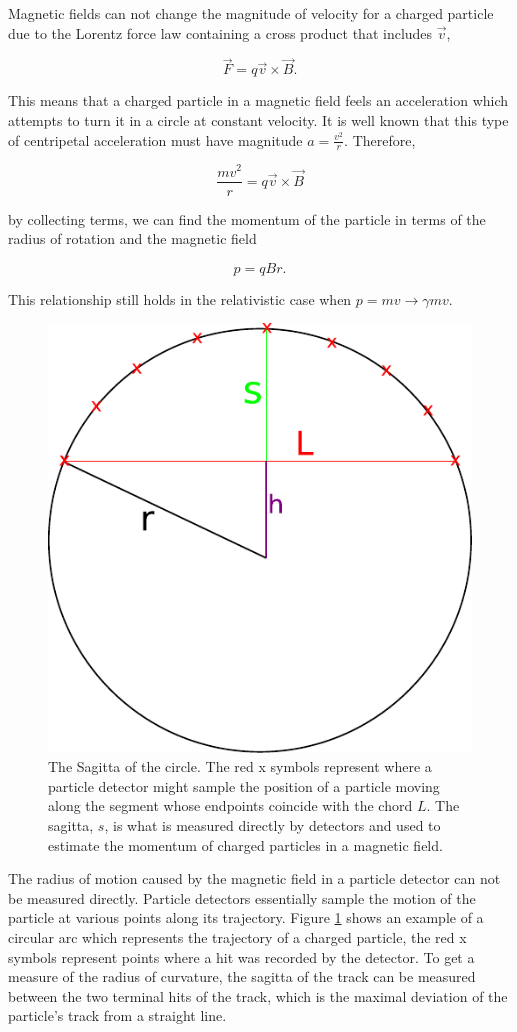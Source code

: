    Magnetic fields can not change the magnitude of velocity for a charged particle due to the Lorentz force law containing a cross product that includes $\vec{v}$,

    \[
      \vec{F} = q\vec{v}\times\vec{B}.
    \]

    This means that a charged particle in a magnetic field feels an acceleration which attempts to turn it in a circle at constant velocity. It is well known that this type of centripetal acceleration must have magnitude $a = \frac{v^2}{r}$. Therefore, 

    \[
      \frac{mv^2}{r} = q\vec{v}\times\vec{B}
    \]

    by collecting terms, we can find the momentum of the particle in terms of the radius of rotation and the magnetic field

    \[
      p = qBr.
    \]

    This relationship still holds in the relativistic case when $p = mv \to \gamma mv$.

    \begin{figure}[h!]
      \centering
      \includegraphics[width=.4\textwidth]{figures/Sagitta.pdf}
      \caption{The Sagitta of the circle. The red x symbols represent where a particle detector might sample the position of a particle moving along the segment whose endpoints coincide with the chord $L$. The sagitta, $s$, is what is measured directly by detectors and used to estimate the momentum of charged particles in a magnetic field.}
      \label{fig:sagitta}
    \end{figure}

    The radius of motion caused by the magnetic field in a particle detector can not be measured directly. Particle detectors essentially sample the motion of the particle at various points along its trajectory. Figure \ref{fig:sagitta} shows an example of a circular arc which represents the trajectory of a charged particle, the red x symbols represent points where a hit was recorded by the detector. To get a measure of the radius of curvature, the sagitta of the track can be measured between the two terminal hits of the track, which is the maximal deviation of the particle's track from a straight line.  

